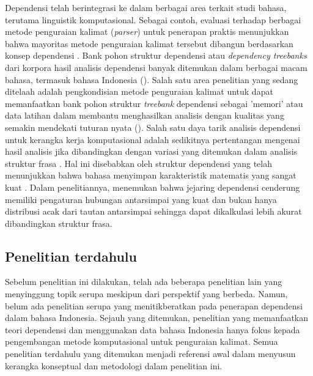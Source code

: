 Dependensi telah berintegrasi ke dalam berbagai area terkait studi bahasa, terutama linguistik komputasional. Sebagai contoh, evaluasi terhadap berbagai metode penguraian kalimat (\textit{parser}) untuk penerapan praktis menunjukkan bahwa mayoritas metode penguraian kalimat tersebut dibangun berdasarkan konsep dependensi \citep{molla2000answer}. Bank pohon struktur dependensi atau \textit{dependency treebanks} dari korpora hasil analisis dependensi banyak ditemukan dalam berbagai macam bahasa, termasuk bahasa Indonesia (\citealp{marcus1993building, abeille2004enriching, carroll2003parser, lin2003dependency, green2012indonesian}). Salah satu area penelitian yang sedang ditelaah adalah pengkondisian metode penguraian kalimat untuk dapat memanfaatkan bank pohon struktur \textit{treebank} dependensi sebagai 'memori' atau data latihan dalam membantu menghasilkan analisis dengan kualitas yang semakin mendekati tuturan nyata (\citealp{nivre2006maltparser, nivre2004incrementality}). Salah satu daya tarik analisis dependensi untuk kerangka kerja komputasional adalah sedikitnya pertentangan mengenai hasil analisis jika dibandingkan dengan variasi yang ditemukan dalam analisis struktur frasa \citep{carroll2003parser}. Hal ini disebabkan oleh struktur dependensi yang telah menunjukkan bahwa bahasa menyimpan karakteristik matematis yang sangat kuat \citep{i2004patterns}. Dalam penelitiannya, \cite{i2004patterns} menemukan bahwa jejaring dependensi cenderung memiliki pengaturan hubungan antarsimpai yang kuat dan bukan hanya distribusi acak dari tautan antarsimpai sehingga dapat dikalkulasi lebih akurat dibandingkan struktur frasa.


\subsection{Penelitian terdahulu}

Sebelum penelitian ini dilakukan, telah ada beberapa penelitian lain yang menyinggung topik serupa meskipun dari perspektif yang berbeda. Namun, belum ada penelitian serupa yang menitikberatkan pada penerapan dependensi dalam bahasa Indonesia. Sejauh yang ditemukan, penelitian yang memanfaatkan teori dependensi dan menggunakan data bahasa Indonesia hanya fokus kepada pengembangan metode komputasional untuk penguraian kalimat. Semua penelitian terdahulu yang ditemukan menjadi referensi awal dalam menyusun kerangka konseptual dan metodologi dalam penelitian ini.

